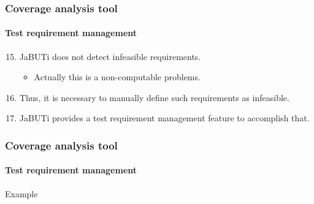 \begin{frame}[parent={cmap:coverage-analysis-tool},hasnext=true,hasprev=true]
\frametitle{Coverage analysis tool}
\framesubtitle{Test requirement management}

\begin{block:procedure}{}
\begin{enumerate}
	\setcounter{enumi}{14}
	\item JaBUTi does not detect infeasible requirements.
	\begin{itemize}
		\item Actually this is a non-computable problems.
	\end{itemize}

	\item Thus, it is necessary to manually define such requirements as
	infeasible.

	\item JaBUTi provides a test requirement management feature to accomplish
	that.
\end{enumerate}
\end{block:procedure}
\end{frame}



\begin{frame}
\frametitle{Coverage analysis tool}
\framesubtitle{Test requirement management}

\begin{block}{Example}
\end{block}
\end{frame}



